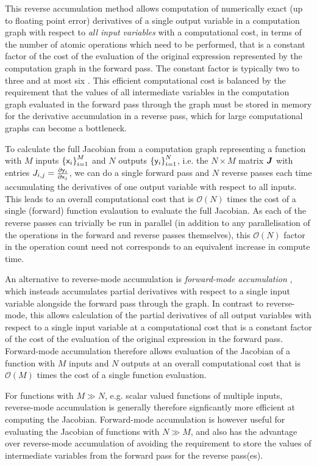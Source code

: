 This reverse accumulation method allows computation of numerically exact (up to floating point error) derivatives of a single output variable in a computation graph with respect to \emph{all input variables} with a computational cost, in terms of the number of atomic operations which need to be performed, that is a constant factor of the cost of the evaluation of the original expression represented by the computation graph in the forward pass. The constant factor is typically two to three and at most six \citep{baydin2015automatic}. This efficient computational cost is balanced by the requirement that the values of all intermediate variables in the computation graph evaluated in the forward pass through the graph must be stored in memory for the derivative accumulation in a reverse pass, which for large computational graphs can become a bottleneck.

To calculate the full Jacobian from a computation graph representing a function with $M$ inputs $\fset{\rvar{x}_i}_{i=1}^M$ and $N$ outputs $\fset{\rvar{y}_i}_{i=1}^N$, i.e. the $N \times M$ matrix $\boldsymbol{J}$ with entries $J_{i,j} = \frac{\partial \mathsf{y}_i}{\partial \mathsf{x}_j}$, we can do a single forward pass and $N$ reverse passes each time accumulating the derivatives of one output variable with respect to all inputs. This leads to an overall computational cost that is $\mathcal{O}(N)$ times the cost of a single (forward) function evalaution to evaluate the full Jacobian. As each of the reverse passes can trivially be run in parallel (in addition to any parallelisation of the operations in the forward and reverse passes themselves), this $\mathcal{O}(N)$ factor in the operation count need not corresponds to an equivalent increase in compute time.

An alternative to reverse-mode accumulation is \emph{forward-mode accumulation} \citep{wengert1964simple}, which insteads accumulates partial derivatives with respect to a single input variable alongside the forward pass through the graph. In contrast to reverse-mode, this allows calculation of the partial derivatives of all output variables with respect to a single input variable at a computational cost that is a constant factor of the cost of the evaluation of the original expression in the forward pass. Forward-mode accumulation therefore allows evaluation of the Jacobian of a function with $M$ inputs and $N$ outputs at an overall computational cost that is $\mathcal{O}(M)$ times the cost of a single function evaluation. 

For functions with $M \gg N$, e.g. scalar valued functions of multiple inputs, reverse-mode accumulation is generally therefore signficantly more efficient at computing the Jacobian. Forward-mode accumulation is however useful for evaluating the Jacobian of functions with $N \gg M$, and also has the advantage over reverse-mode accumulation of avoiding the requirement to store the values of intermediate variables from the forward pass for the reverse pass(es).

